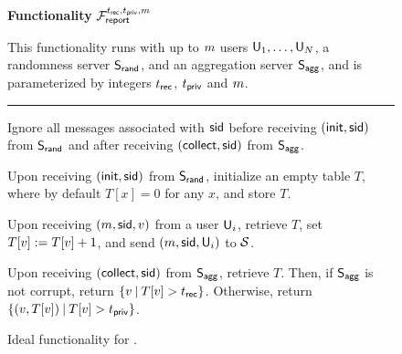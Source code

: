\begin{figure}[h]
	\begin{center}
		\begin{techbox}
			\centerline{\textbf{Functionality} $\mathcal{F}_{\sf report}^{t_{\sf rec},t_{\sf priv},m}$}

			This functionality runs with up to $m$ users $\mathsf{U}_{1},\dots,\mathsf{U}_{N}$, a randomness server $\mathsf{S}_{\mathsf{rand}}$, and an aggregation server $\mathsf{S}_{\mathsf{agg}}$, and is parameterized by integers $t_{\sf rec}$, $t_{\sf priv}$ and $m$.
			\vspace{1mm}
			\hrule
			\vspace{2mm}
			Ignore all messages associated with ${\sf sid}$ before receiving $({\sf init}, {\sf sid})$ from $\mathsf{S}_{\mathsf{rand}}$ and after receiving $({\sf collect}, {\sf sid})$ from $\mathsf{S}_{\mathsf{agg}}$.

			\begin{algenumerate}
				\item Upon receiving $({\sf init}, {\sf sid})$ from $\mathsf{S}_{\mathsf{rand}}$, initialize an empty table $T$, where by default $T[x] = 0$ for any $x$, and store $T$.
				\item Upon receiving $(m, {\sf sid}, v)$ from a user $\mathsf{U}_{i}$, retrieve $T$, set $T[v] := T[v] + 1$, and send $(m, {\sf sid}, \mathsf{U}_i)$ to $\mathcal{S}$.
				\item Upon receiving $({\sf collect}, {\sf sid})$ from $\mathsf{S}_{\mathsf{agg}}$, retrieve $T$. Then, if $\mathsf{S}_{\mathsf{agg}}$ is not corrupt, return $\{v \:|\: T[v] > t_{\sf rec}\}$. Otherwise, return $\{(v, T[v]) \: | \: T[v] > t_{\sf priv}\}$.
			\end{algenumerate}
		\end{techbox}
	\end{center}
	\caption{Ideal functionality for \dopestar.}
	\label{fig:ideal_report}
\end{figure}
